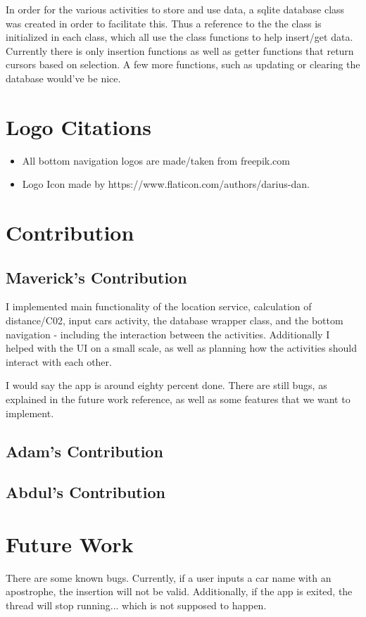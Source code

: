 \documentclass[twoside,twocolumn]{article}
\begin{document}
In order for the various activities to store and use data, a sqlite database class was created in order to facilitate this. Thus a reference to  the the class is initialized in each class, which all use the class functions to help insert/get data. Currently there is only insertion functions as well as getter functions that return cursors based on selection. A few more functions, such as updating or clearing the database would've be nice. 


\section{Logo Citations}
\begin{itemize}
\item All bottom navigation logos are made/taken from freepik.com
\item Logo Icon made by https://www.flaticon.com/authors/darius-dan.
\end{itemize}

\section{Contribution}

\subsection{Maverick's Contribution}
I implemented main functionality of the location service, calculation of distance/C02, input cars activity, the database wrapper class, and the bottom navigation - including the interaction between the activities. Additionally I helped with the UI on a small scale, as well as planning how the activities should interact with each other.

I would say the app is around eighty percent done. There are still bugs, as explained in the future work reference, as well as some features that we want to implement. 

\subsection{Adam's Contribution}


\subsection{Abdul's Contribution}

\section{Future Work}
There are some known bugs. Currently, if a user inputs a car name with an apostrophe, the insertion will not be valid. Additionally, if the app is exited, the thread will stop running... which is not supposed to happen.
\end{document}
